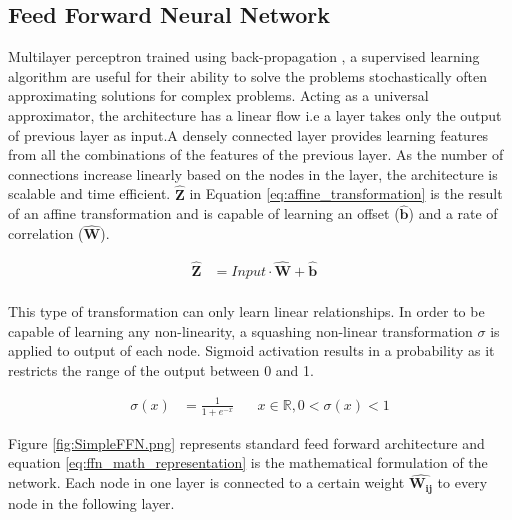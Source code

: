 \usepackage{}\documentclass{article}
\let\oldhat\hat
\renewcommand{\hat}[1]{\oldhat{\mathbf{#1}}}
\begin{document}
\subsection{Feed Forward Neural Network}
\label{sssec:ffn}
Multilayer perceptron trained using back-propagation \cite{Rumelhart1986LearningIR}, a supervised learning algorithm are useful for their ability to solve the problems stochastically often approximating solutions for complex problems. Acting as a universal approximator, the architecture has a linear flow i.e a layer takes only the output of previous layer as input.A densely connected layer provides learning features from all the combinations of the features of the previous layer. As the number of connections increase linearly based on the nodes in the layer, the architecture is scalable and time efficient. $\hat{Z}$ in Equation \ref{eq:affine_transformation} is the result of an affine transformation and is capable of learning an offset ($\hat{b}$) and a rate of correlation ($\hat{W}$).

\begin{equation}
\label{eq:affine_transformation}
\begin{aligned}
\hat{Z} &= Input \cdot \hat{W} + \hat{b}&\\
\end{aligned}
\end{equation}

This type of transformation can only learn linear relationships. In order to be capable of learning any non-linearity, a squashing non-linear transformation $\sigma$ \cite{Han1995TheIO} is applied to output of each node. Sigmoid activation results in a probability as it restricts the range of the output between 0 and 1.

\begin{equation}
\label{eq:sigmoid_activation}
\begin{aligned}
\sigma(x) &= \frac{1}{1+e^{-x}} \;\;\;\;\;\;  x\in\mathbb{R}, 0<\sigma(x)<1
\end{aligned}
\end{equation}

Figure \ref{fig:SimpleFFN.png} represents standard feed forward architecture and equation \ref{eq:ffn_math_representation} is the mathematical formulation of the network. Each node in one layer is connected to a certain weight $\hat{W_{ij}}$ to every node in the following layer. 
\end{document}
